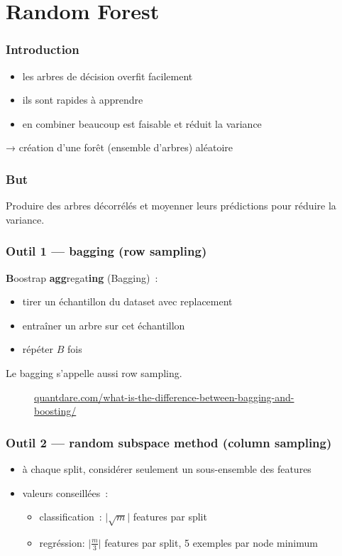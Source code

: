 \documentclass{formation}
\begin{document}
\section{Random Forest}

\begin{frame}
  \frametitle{Introduction}
  \begin{itemize}
  \item les arbres de décision overfit facilement
  \item ils sont rapides à apprendre
  \item en combiner beaucoup est faisable et réduit la variance
  \end{itemize}

  → création d'une forêt (ensemble d'arbres) aléatoire
\end{frame}

\begin{frame}
  \frametitle{But}

  Produire des arbres décorrélés et moyenner leurs prédictions pour
  réduire la variance.
\end{frame}

\begin{frame}
  \frametitle{Outil 1 — bagging (row sampling)}

  \textbf{B}oostrap \textbf{agg}regat\textbf{ing} (Bagging) :

  \begin{itemize}
  \item tirer un échantillon du dataset avec replacement
  \item entraîner un arbre sur cet échantillon
  \item répéter $B$ fois
  \end{itemize}

  Le bagging s'appelle aussi row sampling.

  \begin{figure}
    \centering {}
    \scriptsize{\href{https://quantdare.com/what-is-the-difference-between-bagging-and-boosting/}%
        {quantdare.com/what-is-the-difference-between-bagging-and-boosting/}}
    
  \end{figure}

\end{frame}

\begin{frame}
  \frametitle{Outil 2 — random subspace method (column sampling)}

  \begin{itemize}
  \item à chaque split, considérer seulement un sous-ensemble des
    features
  \item valeurs conseillées :
    \begin{itemize}
    \item classification : $\lvert\sqrt m\rvert$ features par split
    \item regréssion: $\lvert\frac{m}{3}\rvert$ features par split, 5
      exemples par node minimum
    \end{itemize}
  \end{itemize}
\end{frame}
\end{document}
